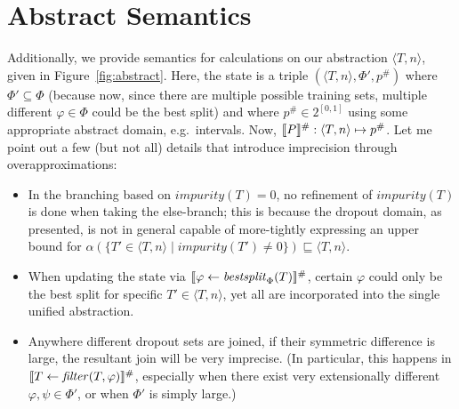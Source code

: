 \section{Abstract Semantics}

Additionally, we provide semantics for calculations on our abstraction $\langle T, n \rangle$,
given in Figure~\ref{fig:abstract}.
Here, the state is a triple $(\langle T, n \rangle, \Phi', p^\#)$
where $\Phi' \subseteq \Phi$ 
(because now, since there are multiple possible training sets,
multiple different $\varphi \in \Phi$ could be the best split)
and where $p^\# \in 2^{[0,1]}$
using some appropriate abstract domain, e.g.\ intervals.
Now, $\llbracket {P} \rrbracket^\# : \langle T, n \rangle \mapsto p^\#$.
Let me point out a few (but not all) details
that introduce imprecision through overapproximations:
\begin{itemize}
    \item In the branching based on $\mathit{impurity}(T) = 0$,
        no refinement of $\mathit{impurity}(T)$ is done when taking the else-branch;
        this is because the dropout domain, as presented,
        is not in general capable of more-tightly expressing an upper bound for
        $\alpha(\{T' \in \langle T, n \rangle \mid \mathit{impurity}(T') \neq 0\})
        \sqsubseteq \langle T, n \rangle$.
    \item When updating the state via
        $\llbracket {\varphi \gets \mathit{bestsplit}_\Phi(T)} \rrbracket^\#$,
        certain $\varphi$ could only be the best split for specific $T' \in \langle T, n \rangle$,
        yet all are incorporated into the single unified abstraction.
    \item Anywhere different dropout sets are joined,
        if their symmetric difference is large, the resultant join
        will be very imprecise.
        (In particular, this happens in $\llbracket {T \gets \mathit{filter}(T, \varphi)} \rrbracket^\#$,
        especially when there exist very extensionally different $\varphi, \psi \in \Phi'$,
        or when $\Phi'$ is simply large.)
\end{itemize}


